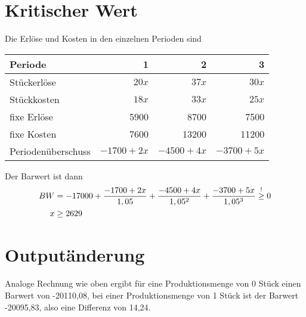 \documentclass{article}
\begin{document}
	\section*{Kritischer Wert}
	Die Erlöse und Kosten in den einzelnen Perioden sind
	\begin{center}
		\begin{tabular}{l|r|r|r}
			Periode & 1 & 2 & 3 \\
			\hline
			Stückerlöse & $20x$ & $37x$ & $30x$ \\
			\hline
			Stückkosten & $18x$ & $33x$ & $25x$ \\
			\hline
			fixe Erlöse & 5900 & 8700 & 7500 \\
			\hline
			fixe Kosten & 7600 & 13200 & 11200 \\
			\hline
			Periodenüberschuss & $-1700+2x$ & $-4500+4x$ & $-3700+5x$
		\end{tabular}
	\end{center}
	Der Barwert ist dann
	\begin{align}
		BW &= -17000 + \frac{-1700+2x}{1,05} + \frac{-4500+4x}{1,05^2} + \frac{-3700+5x}{1,05^3} \overset{!}{\ge} 0 \notag \\
		x &\ge 2629 \notag
	\end{align}
	
	\section*{Outputänderung}
	Analoge Rechnung wie oben ergibt für eine Produktionsmenge von 0 Stück einen Barwert von -20110,08, bei einer Produktionsmenge von 1 Stück ist der Barwert -20095,83, also eine Differenz von 14,24.
	
\end{document}
